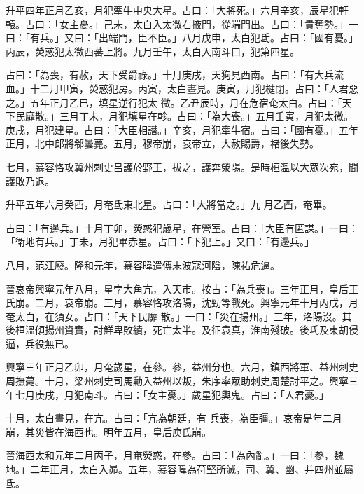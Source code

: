 \begin{pinyinscope}
 升平四年正月乙亥，月犯牽牛中央大星。占曰：「大將死。」六月辛亥，辰星犯軒轅。占曰：「女主憂。」己未，太白入太微右掖門，從端門出。占曰：「貴奪勢。」一曰：「有兵。」又曰：「出端門，臣不臣。」八月戊申，太白犯氐。占曰：「國有憂。」丙辰，熒惑犯太微西蕃上將。九月壬午，太白入南斗口，犯第四星。



 占曰：「為喪，有赦，天下受爵祿。」十月庚戌，天狗見西南。占曰：「有大兵流血。」十二月甲寅，熒惑犯房。丙寅，太白晝見。庚寅，月犯楗閉。占曰：「人君惡之。」五年正月乙巳，填星逆行犯太
 微。乙丑辰時，月在危宿奄太白。占曰：「天下民靡散。」三月丁未，月犯填星在軫。占曰：「為大喪。」五月壬寅，月犯太微。庚戌，月犯建星。占曰：「大臣相譖。」辛亥，月犯牽牛宿。占曰：「國有憂。」五年正月，北中郎將郗曇薨。五月，穆帝崩，哀帝立，大赦賜爵，褚後失勢。



 七月，慕容恪攻冀州刺史呂護於野王，拔之，護奔滎陽。是時桓溫以大眾次宛，聞護敗乃退。



 升平五年六月癸酉，月奄氐東北星。占曰：「大將當之。」九
 月乙酉，奄畢。



 占曰：「有邊兵。」十月丁卯，熒惑犯歲星，在營室。占曰：「大臣有匿謀。」一曰：「衛地有兵。」丁未，月犯畢赤星。占曰：「下犯上。」又曰：「有邊兵。」



 八月，范汪廢。隆和元年，慕容暐遣傅末波寇河陰，陳祐危逼。



 晉哀帝興寧元年八月，星孛大角亢，入天市。按占：「為兵喪」。三年正月，皇后王氏崩。二月，哀帝崩。三月，慕容恪攻洛陽，沈勁等戰死。興寧元年十月丙戌，月奄太白，在須女。占曰：「天下民靡
 散。」一曰：「災在揚州。」三年，洛陽沒。其後桓溫傾揚州資實，討鮮卑敗績，死亡太半。及征袁真，淮南殘破。後氐及東胡侵逼，兵役無已。



 興寧三年正月乙卯，月奄歲星，在參。參，益州分也。六月，鎮西將軍、益州刺史周撫薨。十月，梁州刺史司馬勳入益州以叛，朱序率眾助刺史周楚討平之。興寧三年七月庚戌，月犯南斗。占曰：「女主憂。」歲星犯輿鬼。占曰：「人君憂。」



 十月，太白晝見，在亢。占曰：「亢為朝廷，有
 兵喪，為臣彊。」哀帝是年二月崩，其災皆在海西也。明年五月，皇后庾氏崩。



 晉海西太和元年二月丙子，月奄熒惑，在參。占曰：「為內亂。」一曰：「參，魏地。」二年正月，太白入昴。五年，慕容暐為苻堅所滅，司、冀、幽、并四州並屬氐。




\end{pinyinscope}
